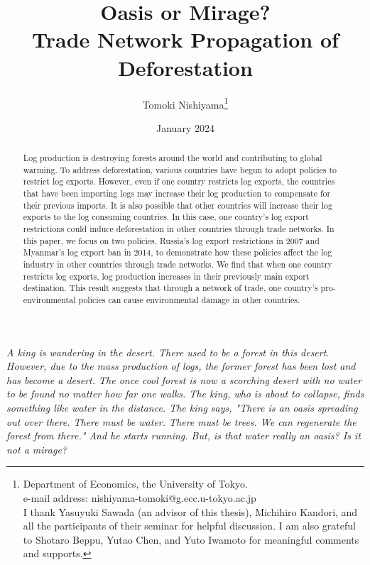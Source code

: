 \documentclass[a4paper,12pt]{article}
\begin{document}
\title{Oasis or Mirage? \\ Trade Network Propagation of Deforestation}
\author{Tomoki Nishiyama\footnote{Department of Economics, the University of Tokyo. \\ e-mail address: nishiyama-tomoki@g.ecc.u-tokyo.ac.jp \\ I thank Yasuyuki Sawada (an advisor of this thesis), Michihiro Kandori, and all the participants of their seminar for helpful discussion. I am also grateful to Shotaro Beppu, Yutao Chen, and Yuto Iwamoto for meaningful comments and supports.}}
\date{January 2024}
\maketitle

\begin{abstract}
    Log production is destroying forests around the world and contributing to global warming. To address deforestation, various countries have begun to adopt policies to restrict log exports. However, even if one country restricts log exports, the countries that have been importing logs may increase their log production to compensate for their previous imports. It is also possible that other countries will increase their log exports to the log consuming countries. In this case, one country's log export restrictions could induce deforestation in other countries through trade networks. In this paper, we focus on two policies, Russia's log export restrictions in 2007 and Myanmar's log export ban in 2014, to demonstrate how these policies affect the log industry in other countries through trade networks. We find that when one country restricts log exports, log production increases in their previously main export destination. This result suggests that through a network of trade, one country's pro-environmental policies can cause environmental damage in other countries.
\end{abstract}

\textit{
    A king is wandering in the desert. There used to be a forest in this desert. However, due to the mass production of logs, the former forest has been lost and has become a desert. The once cool forest is now a scorching desert with no water to be found no matter how far one walks. The king, who is about to collapse, finds something like water in the distance. The king says, "There is an oasis spreading out over there. There must be water. There must be trees. We can regenerate the forest from there." And he starts running. But, is that water really an oasis? Is it not a mirage?
}
\end{document}
